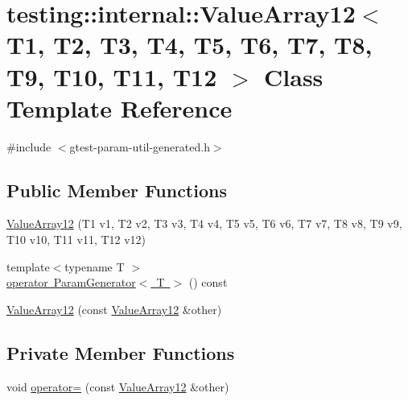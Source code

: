 \hypertarget{classtesting_1_1internal_1_1_value_array12}{}\section{testing\+::internal\+::Value\+Array12$<$ T1, T2, T3, T4, T5, T6, T7, T8, T9, T10, T11, T12 $>$ Class Template Reference}
\label{classtesting_1_1internal_1_1_value_array12}


{\ttfamily \#include $<$gtest-\/param-\/util-\/generated.\+h$>$}

\subsection*{Public Member Functions}
\begin{DoxyCompactItemize}
\item 
\mbox{\hyperlink{classtesting_1_1internal_1_1_value_array12_aaebe12df41b8122fd03f5d6aa1c820a7}{Value\+Array12}} (T1 v1, T2 v2, T3 v3, T4 v4, T5 v5, T6 v6, T7 v7, T8 v8, T9 v9, T10 v10, T11 v11, T12 v12)
\item 
{\footnotesize template$<$typename T $>$ }\\\mbox{\hyperlink{classtesting_1_1internal_1_1_value_array12_acc840a1c32a10ce160731d66c8105e0b}{operator Param\+Generator$<$ T $>$}} () const
\item 
\mbox{\hyperlink{classtesting_1_1internal_1_1_value_array12_a901c95791c3b16ca51fcd7fc1323fef2}{Value\+Array12}} (const \mbox{\hyperlink{classtesting_1_1internal_1_1_value_array12}{Value\+Array12}} \&other)
\end{DoxyCompactItemize}
\subsection*{Private Member Functions}
\begin{DoxyCompactItemize}
\item 
void \mbox{\hyperlink{classtesting_1_1internal_1_1_value_array12_a915c92478f363d4588ceea7d28760ab9}{operator=}} (const \mbox{\hyperlink{classtesting_1_1internal_1_1_value_array12}{Value\+Array12}} \&other)
\end{DoxyCompactItemize}

